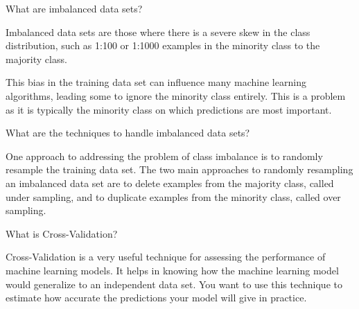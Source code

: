 	\begin{qanda}
		\begin{question}
What are imbalanced data sets?
		\end{question}

		\begin{answer}
Imbalanced data sets are those where there is a severe skew in the class distribution, such as 1:100 or 1:1000 examples in the minority class to the majority class.

This bias in the training data set can influence many machine learning algorithms, leading some to ignore the minority class entirely. This is a problem as it is typically the minority class on which predictions are most important.
		\end{answer}
	\end{qanda}

	\begin{qanda}
		\begin{question}
What are the techniques to handle imbalanced data sets?
		\end{question}

		\begin{answer}
One approach to addressing the problem of class imbalance is to randomly resample the training data set. The two main approaches to randomly resampling an imbalanced data set are to delete examples from the majority class, called under sampling, and to duplicate examples from the minority class, called over sampling.
		\end{answer}
	\end{qanda}

	\begin{qanda}
		\begin{question}
What is Cross-Validation?
		\end{question}

		\begin{answer}
Cross-Validation is a very useful technique for assessing the performance of machine learning models. It helps in knowing how the machine learning model would generalize to an independent data set. You want to use this technique to estimate how accurate the predictions your model will give in practice.
		\end{answer}
	\end{qanda}

